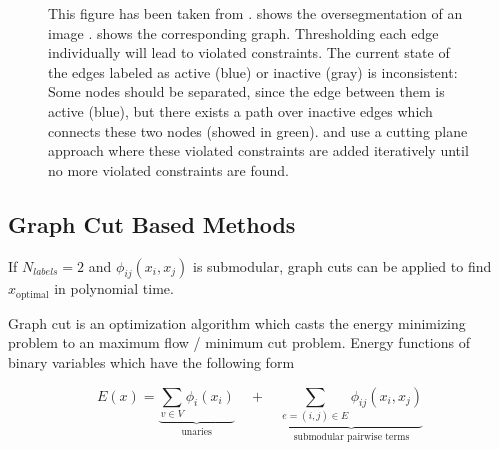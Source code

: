 \begin{figure}[h]
\centering
{}
\caption[Violated multicut constraints]{
This figure has been taken from \cite{andres_2011_iccv}.
 shows the oversegmentation of 
an image .
 shows the corresponding graph.
Thresholding each edge individually will lead to violated constraints.
The current state of the edges  labeled as active (blue) or inactive (gray) is
inconsistent: Some nodes should be separated, since the edge between them is
active (blue), but there exists a path over inactive edges 
which connects these two nodes (showed in green).
\citet{andres_2011_iccv} and \citet{kappes_2011_emmcvpr} use a
cutting plane approach where these violated constraints are added
iteratively until no more violated constraints are found.
} \label{fig:mc_ineq}
\end{figure}




\subsection{Graph Cut Based Methods}\label{sec:gcbased}

If $N_{labels}=2$ and $\phi_{ij}(x_i,x_j)$ is submodular, 
graph cuts \cite{boykov_2001_pami,kolmogorov_2004_pami} can be applied to find $x_{\text{optimal}}$
in polynomial time.

Graph cut is an optimization algorithm which casts the energy minimizing problem
to an maximum flow / minimum cut problem. Energy functions of binary variables which
have the following form 

\begin{equation} \label{eq:gm_graph_cut_energy}
    E(x) = 
    \underbrace{
        \sum_{v \in V} \phi_i(x_i)
    }_{\text{unaries}}
     \quad +  \quad
    \underbrace{
        \sum_{e=(i,j) \in E } \phi_{ij}(x_i,x_j) 
    }_{\text{submodular pairwise terms}}
\end{equation}



